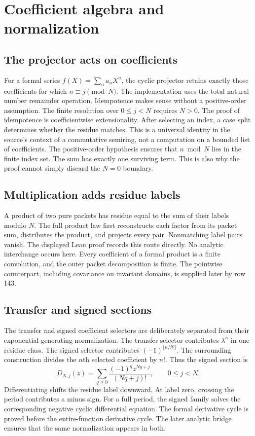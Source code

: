 \section{Coefficient algebra and normalization}
\subsection{The projector acts on coefficients}
For a formal series $f(X)=\sum_n a_nX^n$, the cyclic projector retains exactly those coefficients for which $n\equiv j\pmod N$. The implementation uses the total natural-number remainder operation. Idempotence makes sense without a positive-order assumption. The finite resolution over $0\leq j<N$ requires $N>0$.
The proof of idempotence is coefficientwise extensionality. After selecting an index, a case split determines whether the residue matches. This is a universal identity in the source's context of a commutative semiring, not a computation on a bounded list of coefficients.
The positive-order hypothesis ensures that $n\bmod N$ lies in the finite index set. The sum has exactly one surviving term. This is also why the proof cannot simply discard the $N=0$ boundary.

\subsection{Multiplication adds residue labels}
A product of two pure packets has residue equal to the sum of their labels modulo $N$. The full product law first reconstructs each factor from its packet sum, distributes the product, and projects every pair. Nonmatching label pairs vanish. The displayed Lean proof records this route directly.
No analytic interchange occurs here. Every coefficient of a formal product is a finite convolution, and the outer packet decomposition is finite. The pointwise counterpart, including covariance on invariant domains, is supplied later by row 143.

\subsection{Transfer and signed sections}
The transfer and signed coefficient selectors are deliberately separated from their exponential-generating normalization.
The transfer selector contributes $\lambda^n$ in one residue class. The signed selector contributes $(-1)^{\lfloor n/N\rfloor}$. The surrounding  construction divides the $n$th selected coefficient by $n!$. Thus the signed section is
\[
 D_{N,j}(z)=\sum_{q\geq0}\frac{(-1)^qz^{Nq+j}}{(Nq+j)!},\qquad 0\leq j<N.
\]
Differentiating shifts the residue label downward. At label zero, crossing the period contributes a minus sign.
For a full period, the signed family solves the corresponding negative cyclic differential equation. The formal derivative cycle is proved before the entire-function derivative cycle. The later analytic bridge ensures that the same normalization appears in both.

